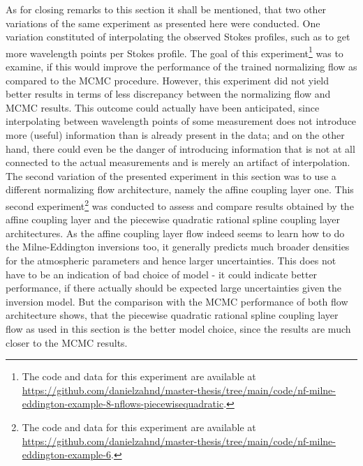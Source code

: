 \documentclass[a4paper,12pt]{report}
\begin{document}
As for closing remarks to this section it shall be mentioned, that two other variations of the same experiment as presented here were conducted. One variation constituted of interpolating the observed Stokes profiles, such as to get more wavelength points per Stokes profile. The goal of this experiment\footnote{The code and data for this experiment are available at \url{https://github.com/danielzahnd/master-thesis/tree/main/code/nf-milne-eddington-example-8-nflows-piecewisequadratic}.} was to examine, if this would improve the performance of the trained normalizing flow as compared to the MCMC procedure. However, this experiment did not yield better results in terms of less discrepancy between the normalizing flow and MCMC results. This outcome could actually have been anticipated, since interpolating between wavelength points of some measurement does not introduce more (useful) information than is already present in the data; and on the other hand, there could even be the danger of introducing information that is not at all connected to the actual measurements and is merely an artifact of interpolation. The second variation of the presented experiment in this section was to use a different normalizing flow architecture, namely the affine coupling layer one. This second experiment\footnote{The code and data for this experiment are available at \url{https://github.com/danielzahnd/master-thesis/tree/main/code/nf-milne-eddington-example-6}.} was conducted to assess and compare results obtained by the affine coupling layer and the piecewise quadratic rational spline coupling layer architectures. As the affine coupling layer flow indeed seems to learn how to do the Milne-Eddington inversions too, it generally predicts much broader densities for the atmospheric parameters and hence larger uncertainties. This does not have to be an indication of bad choice of model - it could indicate better performance, if there actually should be expected large uncertainties given the inversion model. But the comparison with the MCMC performance of both flow architecture shows, that the piecewise quadratic rational spline coupling layer flow as used in this section is the better model choice, since the results are much closer to the MCMC results.

\FloatBarrier

\end{document}
